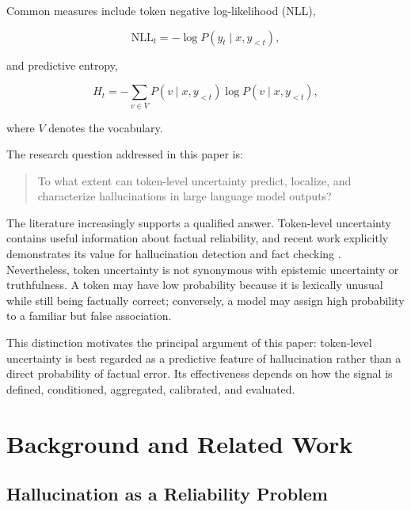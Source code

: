 \documentclass[11pt]{article}
\begin{document}
Common measures include token negative log-likelihood (NLL),

\begin{equation}
\mathrm{NLL}_t
=
-\log P(y_t\mid x,y_{<t}),
\label{eq:nll}
\end{equation}

and predictive entropy,

\begin{equation}
H_t
=
-\sum_{v\in V}
P(v\mid x,y_{<t})
\log P(v\mid x,y_{<t}),
\label{eq:entropy}
\end{equation}

where $V$ denotes the vocabulary.

The research question addressed in this paper is:

\begin{quote}
To what extent can token-level uncertainty predict, localize, and characterize hallucinations in large language model outputs?
\end{quote}

The literature increasingly supports a qualified answer. Token-level uncertainty contains useful information about factual reliability, and recent work explicitly demonstrates its value for hallucination detection and fact checking \cite{fadeeva2024}. Nevertheless, token uncertainty is not synonymous with epistemic uncertainty or truthfulness. A token may have low probability because it is lexically unusual while still being factually correct; conversely, a model may assign high probability to a familiar but false association.

This distinction motivates the principal argument of this paper: token-level uncertainty is best regarded as a predictive feature of hallucination rather than a direct probability of factual error. Its effectiveness depends on how the signal is defined, conditioned, aggregated, calibrated, and evaluated.

\section{Background and Related Work}
\label{sec:related-work}

\subsection{Hallucination as a Reliability Problem}
\label{sec:hallucination-reliability}
\end{document}
